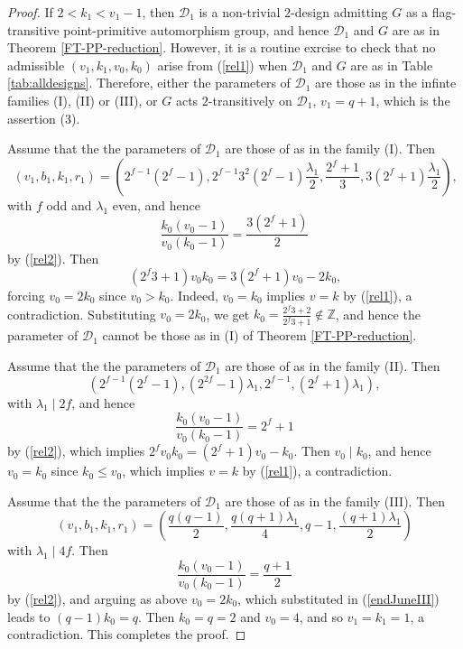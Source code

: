\documentclass[a4paper,twopage,reqno,12pt]{amsart}
\theoremstyle{definition}
\numberwithin{equation}{section}
\renewcommand{\leq}{\leqslant}
\begin{document}
\begin{proof}
If $2<k_{1}<v_{1}-1$, then $\mathcal{D}_{1}$ is a non-trivial $2$-design admitting $G$ as a flag-transitive point-primitive automorphism group, and hence $\mathcal{D}_{1}$ and $G$ are as in Theorem \ref{FT-PP-reduction}. However, it is a routine exrcise to check that no admissible $(v_{1},k_{1},v_{0},k_{0})$ arise from (\ref{rel1}) when $\mathcal{D}_{1}$ and $G$ are as in Table \ref{tab:alldesigns}. Therefore, either the parameters of $\mathcal{D}_{1}$ are those as in the infinte families (I), (II) or (III), or $G$ acts $2$-transitively on $\mathcal{D}_{1}$, $v_{1}=q+1$, which is the assertion (3).

Assume that the the parameters of $\mathcal{D}_{1}$ are those of as in the family (I). Then $$\left(v_{1},b_{1},k_{1},r_{1}\right)=\left(2^{f-1}(2^{f}-1),2^{f-1}3^{2}(2^{f}-1)\frac{\lambda_1 }{2},\frac{2^{f}+1}{3},3(2^{f}+1)\frac{\lambda_1 }{2}\right)\text{,}$$ with $f$ odd and $\lambda_1$ even, and hence
$$\frac{k_{0}(v_{0}-1)}{v_{0}(k_{0}-1)} =\frac{3(2^{f}+1)}{2}$$ 
by (\ref{rel2}). Then
\begin{equation}\label{endJune}
(2^{f}3+1)v_{0}k_{0}=3(2^{f}+1)v_{0}-2k_{0}\text{,}    
\end{equation}
forcing $v_{0}=2k_{0}$ since $v_{0}>k_{0}$. Indeed, $v_{0}=k_{0}$ implies $v=k$ by (\ref{rel1}), a contradiction. Substituting $v_{0}=2k_{0}$, we get $k_{0}=\frac{2^{f}3+2}{2^{f}3+1}  \notin \mathbb{Z}$, and hence the parameter of $\mathcal{D}_{1}$ cannot be those as in (I) of Theorem \ref{FT-PP-reduction}.

Assume that the the parameters of $\mathcal{D}_{1}$ are those of as in the family (II).  Then
$$\left(2^{f-1}(2^{f}-1),(2^{2f}-1)\lambda_1,2^{f-1},(2^{f}+1)\lambda_1\right),$$ with $\lambda_1 \mid 2f$, and hence  
$$\frac{k_{0}(v_{0}-1)}{v_{0}(k_{0}-1)} =2^{f}+1$$ 
by (\ref{rel2}), which implies $2^{f}v_{0}k_{0}=(2^{f}+1)v_{0}-k_{0}$. Then $v_{0}\mid k_{0}$, and hence $v_{0}=k_{0}$ since $k_{0}\leq v_{0}$, which implies $v=k$ by (\ref{rel1}), a contradiction. 

Assume that the the parameters of $\mathcal{D}_{1}$ are those of as in the family (III). Then
$$\left(v_{1},b_{1},k_{1},r_{1}\right)=\left(\frac{q(q-1)}{2},\frac{q(q+1)\lambda_1}{4},q-1,\frac{(q+1)\lambda_1}{2}\right)$$ with $\lambda_1 \mid 4f$. Then
\begin{equation}\label{endJuneIII}
\frac{k_{0}(v_{0}-1)}{v_{0}(k_{0}-1)} =\frac{q+1}{2}
\end{equation}
by (\ref{rel2}), and arguing as above $v_{0}=2k_{0}$, which substituted in (\ref{endJuneIII}) leads to $(q-1)k_{0}=q$. Then $k_{0}=q=2$ and $v_{0}=4$, and so $v_1=k_1=1$, a contradiction. This completes the proof.
\end{proof}
\end{document}
